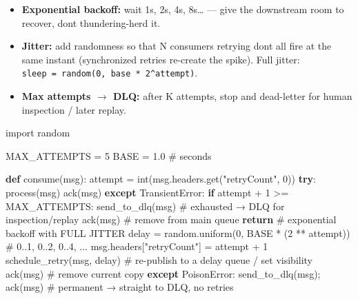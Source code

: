 \documentclass[11pt]{article}
\providecommand{\tightlist}{\setlength{\itemsep}{1pt}\setlength{\parskip}{0pt}}
\newenvironment{Shaded}{\begin{snugshade}}{\end{snugshade}}
\newcommand{\BuiltInTok}[1]{\textcolor[rgb]{0.50,0.55,0.55}{#1}}
\newcommand{\CommentTok}[1]{\textcolor[rgb]{0.48,0.49,0.49}{#1}}
\newcommand{\ControlFlowTok}[1]{\textcolor[rgb]{0.99,0.74,0.29}{\textbf{#1}}}
\newcommand{\DecValTok}[1]{\textcolor[rgb]{0.96,0.45,0.00}{#1}}
\newcommand{\FloatTok}[1]{\textcolor[rgb]{0.96,0.45,0.00}{#1}}
\newcommand{\ImportTok}[1]{\textcolor[rgb]{0.15,0.68,0.38}{#1}}
\newcommand{\KeywordTok}[1]{\textcolor[rgb]{0.81,0.81,0.76}{\textbf{#1}}}
\newcommand{\NormalTok}[1]{\textcolor[rgb]{0.81,0.81,0.76}{#1}}
\newcommand{\OperatorTok}[1]{\textcolor[rgb]{0.81,0.81,0.76}{#1}}
\newcommand{\StringTok}[1]{\textcolor[rgb]{0.96,0.31,0.31}{#1}}
\begin{document}
\begin{itemize}
\tightlist
\item
  \textbf{Exponential backoff:} wait 1s, 2s, 4s, 8s\ldots{} --- give the downstream room to recover, don\textquotesingle t thundering-herd it.
\item
  \textbf{Jitter:} add randomness so that N consumers retrying don\textquotesingle t all fire at the same instant (synchronized retries re-create the spike). Full jitter: \texttt{sleep\ =\ random(0,\ base\ *\ 2\^{}attempt)}.
\item
  \textbf{Max attempts \(\rightarrow\) DLQ:} after K attempts, stop and dead-letter for human inspection / later replay.
\end{itemize}


\begin{Shaded}
\begin{Highlighting}[]
\ImportTok{import}\NormalTok{ random}

\NormalTok{MAX\_ATTEMPTS }\OperatorTok{=} \DecValTok{5}
\NormalTok{BASE }\OperatorTok{=} \FloatTok{1.0}  \CommentTok{\# seconds}

\KeywordTok{def}\NormalTok{ consume(msg):}
\NormalTok{    attempt }\OperatorTok{=} \BuiltInTok{int}\NormalTok{(msg.headers.get(}\StringTok{"retryCount"}\NormalTok{, }\DecValTok{0}\NormalTok{))}
    \ControlFlowTok{try}\NormalTok{:}
\NormalTok{        process(msg)}
\NormalTok{        ack(msg)}
    \ControlFlowTok{except}\NormalTok{ TransientError:}
        \ControlFlowTok{if}\NormalTok{ attempt }\OperatorTok{+} \DecValTok{1} \OperatorTok{\textgreater{}=}\NormalTok{ MAX\_ATTEMPTS:}
\NormalTok{            send\_to\_dlq(msg)          }\CommentTok{\# exhausted → DLQ for inspection/replay}
\NormalTok{            ack(msg)                  }\CommentTok{\# remove from main queue}
            \ControlFlowTok{return}
        \CommentTok{\# exponential backoff with FULL JITTER}
\NormalTok{        delay }\OperatorTok{=}\NormalTok{ random.uniform(}\DecValTok{0}\NormalTok{, BASE }\OperatorTok{*}\NormalTok{ (}\DecValTok{2} \OperatorTok{**}\NormalTok{ attempt))   }\CommentTok{\# 0..1, 0..2, 0..4, ...}
\NormalTok{        msg.headers[}\StringTok{"retryCount"}\NormalTok{] }\OperatorTok{=}\NormalTok{ attempt }\OperatorTok{+} \DecValTok{1}
\NormalTok{        schedule\_retry(msg, delay)    }\CommentTok{\# re{-}publish to a delay queue / set visibility}
\NormalTok{        ack(msg)                      }\CommentTok{\# remove current copy}
    \ControlFlowTok{except}\NormalTok{ PoisonError:}
\NormalTok{        send\_to\_dlq(msg)}\OperatorTok{;}\NormalTok{ ack(msg)    }\CommentTok{\# permanent → straight to DLQ, no retries}
\end{Highlighting}
\end{Shaded}
\end{document}
